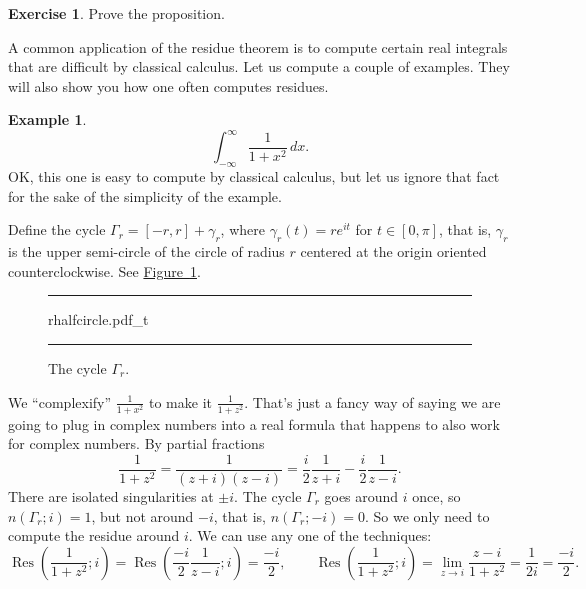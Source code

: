\documentclass[12pt,openany]{book}
\newcommand{\myquote}[1]{``#1''}
\theoremstyle{plain}
\theoremstyle{remark}
\theoremstyle{definition}
\newenvironment{exbox}{%
    \def\FrameCommand{\vrule width 1pt \relax\hspace{10pt}}%
    \MakeFramed{\advance\hsize-\width\FrameRestore}%
}{%
    \endMakeFramed
}
\newenvironment{myfig}{%
\begin{figure}[h!t]
\noindent\rule{\textwidth}{0.5pt}\vspace{12pt}\par\centering}%
{\par\noindent\rule{\textwidth}{0.5pt}
\end{figure}}
\theoremstyle{exercise}
\newtheorem{exercise}{Exercise}[section]
\theoremstyle{example}
\newtheorem{example}[thm]{Example}
\newcommand{\figureref}[1]{\hyperref[#1]{Figure~\ref*{#1}}}
\begin{document}
\begin{exbox}
\begin{exercise}
Prove the proposition.
\end{exercise}
\end{exbox}

A common application of the residue theorem is to compute certain real
integrals that are difficult by classical calculus.  Let us compute
a couple of examples.  They will also show you how one often computes
residues.

\begin{example}
\begin{equation*}
\int_{-\infty}^\infty \frac{1}{1+x^2} \, dx .
\end{equation*}
OK, this one is easy to compute by classical calculus, but let us ignore
that fact for the sake of the simplicity of the example.

Define the cycle $\Gamma_r = [-r,r] + \gamma_r$, where $\gamma_r(t) =
re^{it}$ for $t \in [0,\pi]$, that is, $\gamma_r$ is the upper semi-circle
of the circle of radius $r$ centered at the origin oriented counterclockwise.
See \figureref{fig:rhalfcircle}.

\begin{myfig}
{rhalfcircle.pdf_t}
\caption{The cycle $\Gamma_r$.\label{fig:rhalfcircle}}
\end{myfig}

We \myquote{complexify}
$\frac{1}{1+x^2}$ to make it $\frac{1}{1+z^2}$.
That's just a fancy way of saying we are going to plug in complex numbers
into a real formula that happens to also work for complex numbers.
By partial fractions
\begin{equation*}
\frac{1}{1+z^2} = \frac{1}{(z+i)(z-i)} =
\frac{i}{2} \frac{1}{z+i} - 
\frac{i}{2} \frac{1}{z-i} .
\end{equation*}
There are isolated singularities at $\pm i$.  The cycle
$\Gamma_r$ goes around $i$ once, so $n(\Gamma_r;i) = 1$,
but not around $-i$, that is, $n(\Gamma_r;-i) = 0$.
So we only need to compute
the residue around $i$.  We can use any one of the techniques:
\begin{equation*}
\operatorname{Res}\left(\frac{1}{1+z^2};i\right) =
\operatorname{Res}\left(
\frac{-i}{2} \frac{1}{z-i};
i\right) = \frac{-i}{2} ,
\qquad
\operatorname{Res}\left(\frac{1}{1+z^2};i\right) =
\lim_{z \to i} \frac{z-i}{1+z^2}
=
\frac{1}{2i} = \frac{-i}{2}.
\end{equation*}


\end{example}
\end{document}
